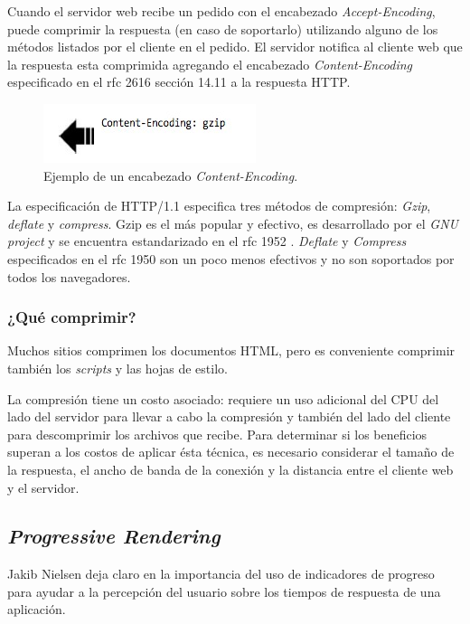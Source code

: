 Cuando el servidor web recibe un pedido con el encabezado \emph{Accept-Encoding}, puede comprimir la respuesta (en caso de soportarlo) utilizando alguno de los métodos listados
por el cliente en el pedido. El servidor notifica al cliente web que la respuesta esta comprimida agregando el encabezado \emph{Content-Encoding} especificado en el rfc 2616
\cite{rfc2616} sección 14.11 a la respuesta HTTP.

\begin{figure}[h!]
\centering
\includegraphics[scale=0.5]{figuras/hpws/content-encoding.jpg}
  \caption{Ejemplo de un encabezado \emph{Content-Encoding}.}
    \label{fig.gzip-respuest}
\end{figure}

La especificación de HTTP/1.1 especifica tres métodos de compresión: \emph{Gzip}, \emph{deflate} y \emph{compress}. Gzip es el más popular y efectivo, es
desarrollado por el \emph{GNU project} y se encuentra estandarizado en el rfc 1952 \cite{rfc1952}. \emph{Deflate} y
\emph{Compress} especificados en el rfc 1950 \cite{rfc1950} son un poco menos efectivos y no son soportados por todos los navegadores.

\subsubsection{¿Qué comprimir?}

Muchos sitios comprimen los documentos HTML, pero es conveniente comprimir también los \emph{scripts} y las hojas de estilo.

La compresión tiene un costo asociado: requiere un uso adicional del CPU del lado del servidor para llevar a cabo la compresión y también del lado del cliente
para descomprimir los archivos que recibe. Para determinar si los beneficios superan a los costos de aplicar ésta técnica, es necesario considerar el tamaño de la respuesta, el
ancho de banda de la conexión y la distancia entre el cliente web y el servidor.

\subsection{\emph{Progressive Rendering}}

Jakib Nielsen deja claro en \cite{Nielsen:1993} la importancia del uso de indicadores de progreso para ayudar a la percepción del
usuario sobre los tiempos de respuesta de una aplicación.


